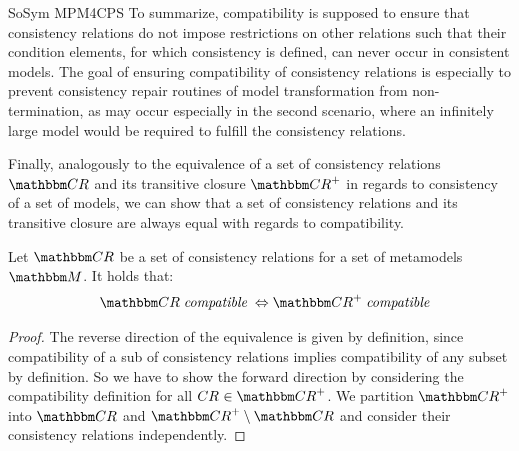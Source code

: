 \begin{copiedFrom}{SoSym MPM4CPS}
To summarize, compatibility is supposed to ensure that consistency relations do not impose restrictions on other relations such that their condition elements, for which consistency is defined, can never occur in consistent models.
The goal of ensuring compatibility of consistency relations is especially to prevent consistency repair routines of model transformation from non-termination, as may occur especially in the second scenario, where an infinitely large model would be required to fulfill the consistency relations.

Finally, analogously to the equivalence of a set of consistency relations $\consistencyrelationset{CR}$ and its transitive closure $\transitiveclosure{\consistencyrelationset{CR}}$ in regards to consistency of a set of models, we can show that a set of consistency relations and its transitive closure are always equal with regards to compatibility.

\begin{lemma} \label{lemma:compatibilitytransitiveclosure}
    Let $\consistencyrelationset{CR}$ be a set of consistency relations for a set of metamodels $\metamodelset{M}$.
    It holds that:
    \begin{align*}
        \formulaskip
        \consistencyrelationset{CR} \mathtext{compatible} \equivalent
        \transitiveclosure{\consistencyrelationset{CR}} \mathtext{compatible}
    \end{align*}
\end{lemma}

\begin{proof}
    The reverse direction of the equivalence is given by definition, since compatibility of a sub of consistency relations implies compatibility of any subset by definition.
    So we have to show the forward direction by considering the compatibility definition for all $\consistencyrelation{CR}{} \in \transitiveclosure{\consistencyrelationset{CR}}$.
    We partition $\transitiveclosure{\consistencyrelationset{CR}}$ into $\consistencyrelationset{CR}$ and $\transitiveclosure{\consistencyrelationset{CR}} \setminus \consistencyrelationset{CR}$ and consider their consistency relations independently.
    

\end{proof}
\end{copiedFrom}
